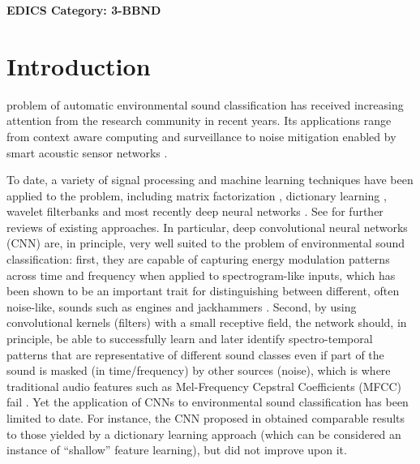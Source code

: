 \documentclass[journal,pdf]{IEEEtran}
\begin{document}
\ifCLASSOPTIONpeerreview
\begin{center} \bfseries EDICS Category: 3-BBND \end{center}
\fi
\IEEEpeerreviewmaketitle



\section{Introduction}
\label{sec:intro}

 problem of automatic environmental sound classification has received increasing attention from the research community in recent years.
Its applications range from context aware computing \cite{chu:EnvironmentalSoundRec:TASLP:09} and surveillance \cite{radhakrishnan:AudioSurveillance:WASPAA:05} to noise mitigation enabled by smart acoustic sensor networks \cite{Mydlarz:AcousticMonitoring:AA:16}.

To date, a variety of signal processing and machine learning techniques have been applied to the problem, including matrix factorization \cite{Mesaros:SEDNMF:ICASSP:15,Benetos:AED:ICASSP:16,Bisot:AcousticSceneNMF:ICASSP:16},  dictionary learning \cite{Salamon:UnsupervisedUrban:ICASSP:15,Salamon:ScattteringUrban:EUSIPCO:15}, wavelet filterbanks \cite{Geiger:AEDGabor:EUSIPCO:15,Salamon:ScattteringUrban:EUSIPCO:15} and most recently deep neural networks \cite{Cakir:SEDDNN:IJCNN:15,Piczak:EnvSoundCNN:MLSP:15}. See \cite{giannoulis:AASPChallenge:WASPAA:13,Stowell:AEDreview:TMM:15,Sigtia:AEDPerformanceVsComp:TASLP:16} for further reviews of existing approaches.
In particular, deep convolutional neural networks (CNN) \cite{Lecun:CNN:IEEE:98} are, in principle, very well suited to the problem of environmental sound classification: first, they are capable of capturing energy modulation patterns across time and frequency when applied to spectrogram-like inputs, which has been shown to be an important trait for distinguishing between different, often noise-like, sounds such as engines and jackhammers \cite{Salamon:ScattteringUrban:EUSIPCO:15}. Second, by using convolutional kernels (filters) with a small receptive field, the network should, in principle, be able to successfully learn and later identify spectro-temporal patterns that are representative of different sound classes even if part of the sound is masked (in time/frequency) by other sources (noise), which is where traditional audio features such as Mel-Frequency Cepstral Coefficients (MFCC) fail \cite{cotton:SpectroTemporal:WASPAA:11}. Yet the application of CNNs to environmental sound classification has been limited to date. For instance, the CNN proposed in \cite{Piczak:EnvSoundCNN:MLSP:15} obtained comparable results to those yielded by a dictionary learning approach \cite{Salamon:UnsupervisedUrban:ICASSP:15} (which can be considered an instance of ``shallow'' feature learning), but did not improve upon it.
\end{document}
